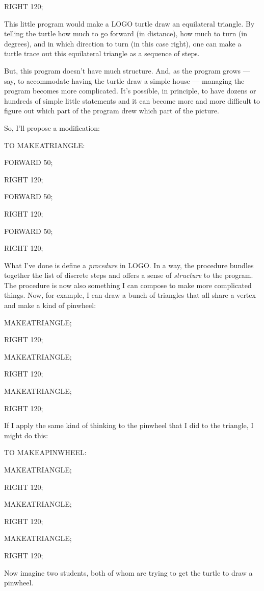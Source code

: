 RIGHT 120;

This little program would make a LOGO turtle draw an equilateral
triangle. By telling the turtle how much to go forward (in distance),
how much to turn (in degrees), and in which direction to turn (in this
case right), one can make a turtle trace out this equilateral triangle
as a sequence of steps.

But, this program doesn't have much structure. And, as the program grows
--- say, to accommodate having the turtle draw a simple house ---
managing the program becomes more complicated. It's possible, in
principle, to have dozens or hundreds of simple little statements and it
can become more and more difficult to figure out which part of the
program drew which part of the picture.

So, I'll propose a modification:

TO MAKEATRIANGLE:

FORWARD 50;

RIGHT 120;

FORWARD 50;

RIGHT 120;

FORWARD 50;

RIGHT 120;

What I've done is define a \emph{procedure} in LOGO. In a way, the
procedure bundles together the list of discrete steps and offers a sense
of \emph{structure} to the program. The procedure is now also something
I can compose to make more complicated things. Now, for example, I can
draw a bunch of triangles that all share a vertex and make a kind of
pinwheel:

MAKEATRIANGLE;

RIGHT 120;

MAKEATRIANGLE;

RIGHT 120;

MAKEATRIANGLE;

RIGHT 120;

If I apply the same kind of thinking to the pinwheel that I did to the
triangle, I might do this:

TO MAKEAPINWHEEL:

MAKEATRIANGLE;

RIGHT 120;

MAKEATRIANGLE;

RIGHT 120;

MAKEATRIANGLE;

RIGHT 120;

Now imagine two students, both of whom are trying to get the turtle to
draw a pinwheel.


